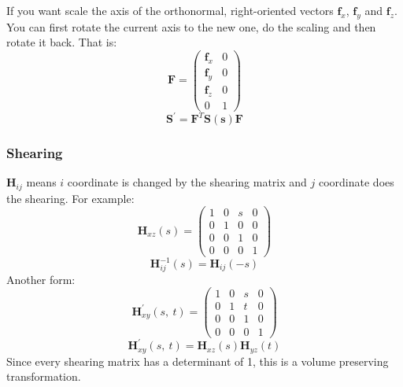 \documentclass[10pt, a4paper]{article}
\begin{document}
            \indent If you want scale the axis of the orthonormal, right-oriented vectors $\textbf{f}_x$, $\textbf{f}_y$ and $\textbf{f}_z$. You can first rotate the current axis to the new one, do the scaling and then rotate it back. That is:\newline
            \begin{equation*}
                \textbf{F} = 
                \begin{pmatrix}
                    \textbf{f}_x & 0\\
                    \textbf{f}_y & 0\\
                    \textbf{f}_z & 0\\
                    0 & 1
                \end{pmatrix}
            \end{equation*}
            $$\textbf{S}^{'} = \textbf{F}^T\textbf{S}(\textbf{s})\textbf{F}$$
        
            \subsubsection{Shearing}
            $\textbf{H}_{ij}$ means $i$ coordinate is changed by the shearing matrix and $j$ coordinate does the shearing. For example:\newline
            \begin{equation*}
                \textbf{H}_{xz}(s)=
                \begin{pmatrix}
                    1 & 0 & s & 0\\
                    0 & 1 & 0 & 0\\
                    0 & 0 & 1 & 0\\
                    0 & 0 & 0 & 1
                \end{pmatrix}
            \end{equation*}
            $$\textbf{H}_{ij}^{-1}(s) = \textbf{H}_{ij}(-s)$$
            \indent Another form:\newline
            \begin{equation*}
                \textbf{H}_{xy}^{'}(s,\ t) =
                \begin{pmatrix}
                    1 & 0 & s & 0\\
                    0 & 1 & t & 0\\
                    0 & 0 & 1 & 0\\
                    0 & 0 & 0 & 1
                \end{pmatrix}
            \end{equation*}
            $$\textbf{H}_{xy}^{'}(s,\ t) = \textbf{H}_{xz}(s)\textbf{H}_{yz}(t)$$
            \indent Since every shearing matrix has a determinant of 1, this is a volume preserving transformation.
        
\end{document}

